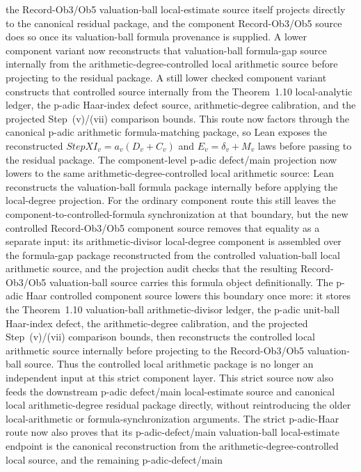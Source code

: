 \documentclass[11pt]{article}
\theoremstyle{plain}
\theoremstyle{definition}
\theoremstyle{remark}
\begin{document}
the Record-Ob3/Ob5 valuation-ball local-estimate source itself projects
directly to the canonical residual package, and the component Record-Ob3/Ob5
source does so once its valuation-ball formula provenance is supplied.  A
lower component variant now reconstructs that valuation-ball formula-gap source
internally from the arithmetic-degree-controlled local arithmetic source before
projecting to the residual package.  A still lower checked component variant
constructs that controlled source internally from the Theorem~1.10
local-analytic ledger, the p-adic Haar-index defect source, arithmetic-degree
calibration, and the projected Step~(v)/(vii) comparison bounds.  This route
now factors through the canonical p-adic arithmetic formula-matching package,
so Lean exposes the reconstructed \(StepXI_v=a_v(D_v+C_v)\) and
\(E_v=\delta_v+M_v\) laws before passing to the residual package.  The
component-level p-adic defect/main projection now lowers to the same
arithmetic-degree-controlled local arithmetic source: Lean reconstructs the
valuation-ball formula package internally before applying the local-degree
projection.  For the ordinary component route this still leaves the
component-to-controlled-formula synchronization at that boundary, but the new
controlled Record-Ob3/Ob5 component source removes that equality as a separate
input: its arithmetic-divisor local-degree component is assembled over the
formula-gap package reconstructed from the controlled valuation-ball local
arithmetic source, and the projection audit checks that the resulting
Record-Ob3/Ob5 valuation-ball source carries this formula object definitionally.
The p-adic Haar controlled component source lowers this boundary once more:
it stores the Theorem~1.10 valuation-ball arithmetic-divisor ledger, the
p-adic unit-ball Haar-index defect, the arithmetic-degree calibration, and the
projected Step~(v)/(vii) comparison bounds, then reconstructs the controlled
local arithmetic source internally before projecting to the Record-Ob3/Ob5
valuation-ball source.  Thus the controlled local arithmetic package is no
longer an independent input at this strict component layer.  This strict
source now also feeds the downstream p-adic defect/main local-estimate source
and canonical local arithmetic-degree residual package directly, without
reintroducing the older local-arithmetic or formula-synchronization arguments.
The strict p-adic-Haar route now also proves that its p-adic-defect/main
valuation-ball local-estimate endpoint is the canonical reconstruction from the
arithmetic-degree-controlled local source, and the remaining p-adic-defect/main
\end{document}
